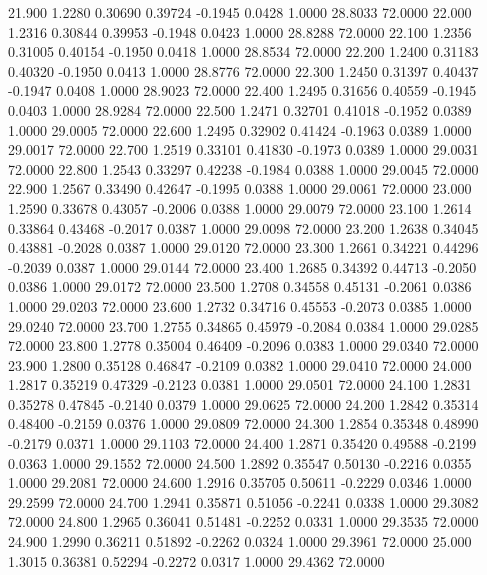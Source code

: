   21.900   1.2280   0.30690   0.39724  -0.1945   0.0428   1.0000  28.8033  72.0000
  22.000   1.2316   0.30844   0.39953  -0.1948   0.0423   1.0000  28.8288  72.0000
  22.100   1.2356   0.31005   0.40154  -0.1950   0.0418   1.0000  28.8534  72.0000
  22.200   1.2400   0.31183   0.40320  -0.1950   0.0413   1.0000  28.8776  72.0000
  22.300   1.2450   0.31397   0.40437  -0.1947   0.0408   1.0000  28.9023  72.0000
  22.400   1.2495   0.31656   0.40559  -0.1945   0.0403   1.0000  28.9284  72.0000
  22.500   1.2471   0.32701   0.41018  -0.1952   0.0389   1.0000  29.0005  72.0000
  22.600   1.2495   0.32902   0.41424  -0.1963   0.0389   1.0000  29.0017  72.0000
  22.700   1.2519   0.33101   0.41830  -0.1973   0.0389   1.0000  29.0031  72.0000
  22.800   1.2543   0.33297   0.42238  -0.1984   0.0388   1.0000  29.0045  72.0000
  22.900   1.2567   0.33490   0.42647  -0.1995   0.0388   1.0000  29.0061  72.0000
  23.000   1.2590   0.33678   0.43057  -0.2006   0.0388   1.0000  29.0079  72.0000
  23.100   1.2614   0.33864   0.43468  -0.2017   0.0387   1.0000  29.0098  72.0000
  23.200   1.2638   0.34045   0.43881  -0.2028   0.0387   1.0000  29.0120  72.0000
  23.300   1.2661   0.34221   0.44296  -0.2039   0.0387   1.0000  29.0144  72.0000
  23.400   1.2685   0.34392   0.44713  -0.2050   0.0386   1.0000  29.0172  72.0000
  23.500   1.2708   0.34558   0.45131  -0.2061   0.0386   1.0000  29.0203  72.0000
  23.600   1.2732   0.34716   0.45553  -0.2073   0.0385   1.0000  29.0240  72.0000
  23.700   1.2755   0.34865   0.45979  -0.2084   0.0384   1.0000  29.0285  72.0000
  23.800   1.2778   0.35004   0.46409  -0.2096   0.0383   1.0000  29.0340  72.0000
  23.900   1.2800   0.35128   0.46847  -0.2109   0.0382   1.0000  29.0410  72.0000
  24.000   1.2817   0.35219   0.47329  -0.2123   0.0381   1.0000  29.0501  72.0000
  24.100   1.2831   0.35278   0.47845  -0.2140   0.0379   1.0000  29.0625  72.0000
  24.200   1.2842   0.35314   0.48400  -0.2159   0.0376   1.0000  29.0809  72.0000
  24.300   1.2854   0.35348   0.48990  -0.2179   0.0371   1.0000  29.1103  72.0000
  24.400   1.2871   0.35420   0.49588  -0.2199   0.0363   1.0000  29.1552  72.0000
  24.500   1.2892   0.35547   0.50130  -0.2216   0.0355   1.0000  29.2081  72.0000
  24.600   1.2916   0.35705   0.50611  -0.2229   0.0346   1.0000  29.2599  72.0000
  24.700   1.2941   0.35871   0.51056  -0.2241   0.0338   1.0000  29.3082  72.0000
  24.800   1.2965   0.36041   0.51481  -0.2252   0.0331   1.0000  29.3535  72.0000
  24.900   1.2990   0.36211   0.51892  -0.2262   0.0324   1.0000  29.3961  72.0000
  25.000   1.3015   0.36381   0.52294  -0.2272   0.0317   1.0000  29.4362  72.0000

